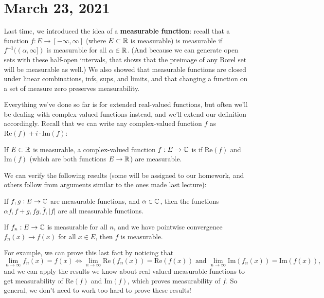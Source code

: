 \pagebreak\section*{March 23, 2021}

Last time, we introduced the idea of a \textbf{measurable function}: recall that a function $f: E \to [-\infty, \infty]$ (where $E \subset \mathbb R$ is measurable) is measurable if $f^{-1}((\alpha, \infty])$ is measurable for all $\alpha \in \mathbb R$. (And because we can generate open sets with these half-open intervals, that shows that the preimage of any Borel set will be measurable as well.) We also showed that measurable functions are closed under linear combinations, infs, sups, and limits, and that changing a function on a set of measure zero preserves measurability.

Everything we've done so far is for extended real-valued functions, but often we'll be dealing with complex-valued functions instead, and we'll extend our definition accordingly. Recall that we can write any complex-valued function $f$ as $\text{Re}(f) + i \cdot \text{Im}(f)$:

\begin{definition}
If $E \subset \mathbb R$ is measurable, a complex-valued function $f: E \to \mathbb C$ is  if $\text{Re}(f)$ and $\text{Im}(f)$ (which are both functions $E \to \mathbb R$) are measurable.
\end{definition}

We can verify the following results (some will be assigned to our homework, and others follow from arguments similar to the ones made last lecture):

\begin{theorem}\label{compmeaslincomb}
If $f, g: E \to \mathbb C$ are measurable functions, and $\alpha \in \mathbb C$, then the functions $\alpha f, f + g, fg, \overline{f}, |f|$ are all measurable functions.
\end{theorem}

\begin{theorem}
If $f_n: E \to \mathbb C$ is measurable for all $n$, and we have pointwise convergence $f_n(x) \to f(x)$ for all $x \in E$, then $f$ is measurable.
\end{theorem}

For example, we can prove this last fact by noticing that 
\[
    \lim_{n \to \infty} f_n(x) = f(x) \iff \lim_{n \to \infty} \text{Re}(f_n(x)) = \text{Re}(f(x)) \text{ and } \lim_{n \to \infty} \text{Im}(f_n(x)) = \text{Im}(f(x)),
\]  
and we can apply the results we know about real-valued measurable functions to get measurability of $\text{Re}(f)$ and $\text{Im}(f)$, which proves measurability of $f$. So general, we don't need to work too hard to prove these results!

